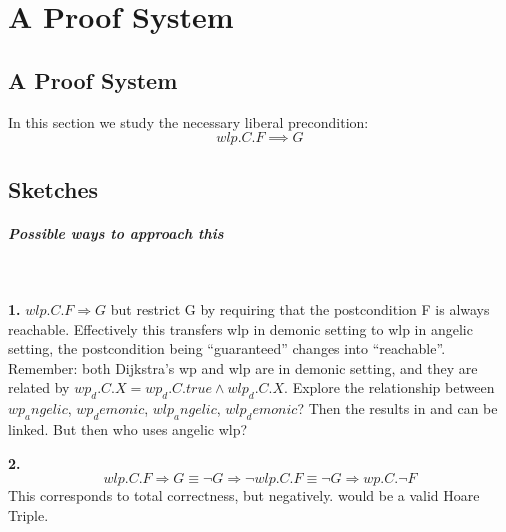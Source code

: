 \chapter{A Proof System}\label{ch:system} %

\section{A Proof System}
In this section we study the necessary liberal precondition: 
$$wlp.C.F\implies G$$


\section{Sketches} 

\paragraph{Possible ways to approach this}\ 

\textbf{1.} $wlp.C.F \Longrightarrow G $ but restrict G by requiring that the postcondition F is always reachable. 
Effectively this transfers wlp in demonic setting to wlp in angelic setting, the postcondition being ``guaranteed'' changes into ``reachable''. 
Remember: both Dijkstra's wp and wlp are in demonic setting, and they are related by $wp_d.C.X = wp_d.C.true \wedge wlp_d.C.X$. 
Explore the relationship between $wp_angelic$, $wp_demonic$, $wlp_angelic$, $wlp_demonic$? 
Then the results in \cite{zhang22} and \cite{dijkstra90} can be linked. 
But then who uses angelic wlp? 

\textbf{2.}$$wlp.C.F \Longrightarrow G \equiv \neg G \Longrightarrow \neg wlp.C.F \equiv \neg G \Longrightarrow  wp.C.\neg F $$ 
This corresponds to total correctness, but negatively. 
 would be a valid Hoare Triple. 

